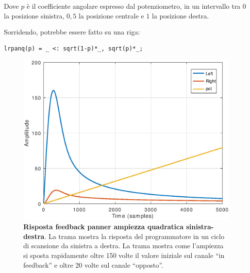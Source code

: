 Dove $ p $ è il coefficiente angolare espresso dal potenziometro, in un
intervallo tra $ 0 $ la posizione sinistra, $ 0,5 $ la posizione centrale e $1$
la posizione destra.

Sorridendo, potrebbe essere fatto su una riga:

\begin{lstlisting}
lrpanq(p) = _ <: sqrt(1-p)*_, sqrt(p)*_;
\end{lstlisting}

\begin{figure}[t]
\centering
\includegraphics[width=1\columnwidth]{CAPITOLI/1000/IMG/lrpanfb_init}
\caption{\textbf{Risposta feedback panner ampiezza quadratica sinistra-destra}.
La trama mostra la risposta del programmatore in un ciclo di scansione da
sinistra a destra. La trama mostra come l'ampiezza si sposta rapidamente oltre
150 volte il valore iniziale sul canale “in feedback” e oltre 20 volte sul
canale “opposto”.}
\label{fig:lrpanfb1}
\end{figure}

